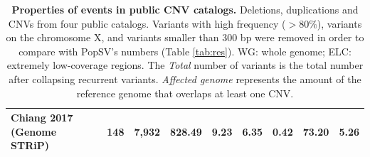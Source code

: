 \begin{table}[htp]
{\begin{tabular}{|l|r|rrr|r|r|rr|}
      Chiang 2017 ({\sf Genome STRiP})    & 148   & 7,932  & 828.49                          & 9.23      & 6.35     & 0.42  & 73.20  & 5.26 \\
      \hline
    \end{tabular}
  }
    \caption[Properties of events in public CNV catalogs]{{\bf Properties of events in public CNV catalogs.} {\small Deletions, duplications and CNVs from four public catalogs. Variants with high frequency ($>80\%$), variants on the chromosome X, and variants smaller than 300 bp were removed in order to compare with {\sf PopSV}'s numbers (Table \ref{tab:res}). WG: whole genome; ELC: extremely low-coverage regions. The {\it Total} number of variants is the total number after collapsing recurrent variants. {\it Affected genome} represents the amount of the reference genome that overlaps at least one CNV.}}
  \label{tab:1kgp}
\end{table}


